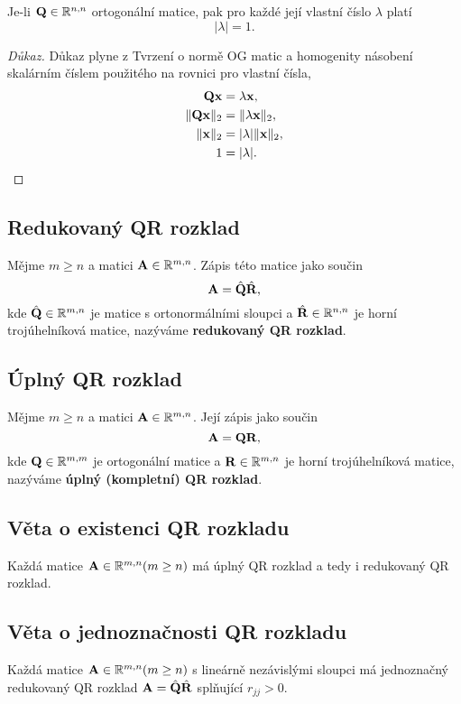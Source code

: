 Je-li $\mathbf{Q} \in \mathbb{R}^{n,n}$ ortogonální matice, pak pro každé její vlastní číslo
$\lambda$ platí
\[ |\lambda| = 1. \]

\begin{proof}[Důkaz]
	Důkaz plyne z Tvrzení o normě OG matic a homogenity násobení skalárním číslem použitého na rovnici pro vlastní čísla,
	\begin{align*}
		\mathbf{Q} \mathbf{x}       & = \lambda \mathbf{x},         \\
		\|\mathbf{Q} \mathbf{x}\|_2 & = \|\lambda \mathbf{x}\|_2,   \\
		\|\mathbf{x}\|_2     & = |\lambda| \|\mathbf{x}\|_2, \\
		1             & = |\lambda|.
	\end{align*}
\end{proof}

\subsection*{Redukovaný QR rozklad}

Mějme $m\geq n$ a matici $\mathbf{A} \in \mathbb{R}^{m,n}$. Zápis této matice jako součin
\[ \mathbf{A} = \hat{\mathbf{Q}}\hat{\mathbf{R}}, \]
kde $\hat{\mathbf{Q}} \in \mathbb{R}^{m,n}$ je matice s ortonormálními sloupci a $\hat{\mathbf{R}}
	\in \mathbb{R}^{n,n}$ je horní trojúhelníková matice, nazýváme \textbf{redukovaný QR
	rozklad}.

\subsection*{Úplný QR rozklad}

Mějme $m\geq n$ a matici $\mathbf{A} \in \mathbb{R}^{m,n}$. Její zápis jako součin
\[ \mathbf{A} = \mathbf{Q} \mathbf{R}, \]
kde $\mathbf{Q} \in \mathbb{R}^{m,m}$ je ortogonální matice a $\mathbf{R} \in \mathbb{R}^{m,n}$ je horní
trojúhelníková matice, nazýváme \textbf{úplný (kompletní) QR rozklad}.

\subsection*{Věta o existenci QR rozkladu}

Každá matice $\mathbf{A} \in \mathbb{R}^{m,n} (m \ge n)$ má úplný QR rozklad a tedy i
redukovaný QR rozklad.

\subsection*{Věta o jednoznačnosti QR rozkladu}

Každá matice $\mathbf{A} \in \mathbb{R}^{m,n} (m \ge n)$ s lineárně nezávislými sloupci má
jednoznačný redukovaný QR rozklad $\mathbf{A}=\hat{\mathbf{Q}}\hat{\mathbf{R}}$ splňující $r_{jj} >
	0$.

